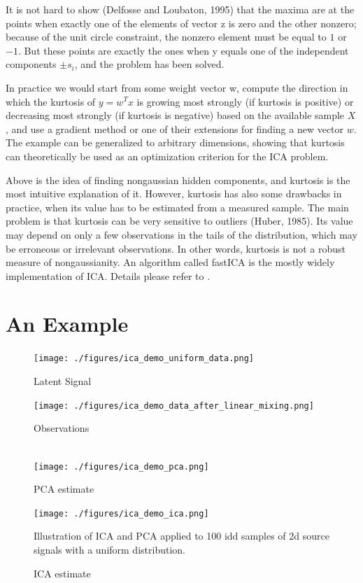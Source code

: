 \documentclass[a4paper]{book}
\begin{document}
    It is not hard to show (Delfosse and Loubaton, 1995) that the maxima are
    at the points when exactly one of the elements of vector z is zero and
    the other nonzero; because of the unit circle constraint, the nonzero
    element must be equal to $1$ or $-1$. But these points are exactly the ones
    when y equals one of the independent components $±s_{i}$, and the problem has
    been solved.

    In practice we would start from some weight vector w, compute the
    direction in which the kurtosis of $y = w^{T}x$ is growing most strongly
    (if kurtosis is positive) or decreasing most strongly (if kurtosis
    is negative) based on the available sample $X$, and use a gradient
    method or one of their extensions for finding a new vector $w$. The
    example can be generalized to arbitrary dimensions, showing that
    kurtosis can theoretically be used as an optimization criterion for
    the ICA problem.

    Above is the idea of finding nongaussian hidden components, and
    kurtosis is the most intuitive explanation of it. However, kurtosis
    has also some drawbacks in practice, when its value has to be
    estimated from a measured sample. The main problem is that kurtosis
    can be very sensitive to outliers (Huber, 1985).  Its value may
    depend on only a few observations in the tails of the distribution,
    which may be erroneous or irrelevant observations. In other words,
    kurtosis is not a robust measure of nongaussianity. An algorithm
    called fastICA is the mostly widely implementation of ICA. Details
    please refer to \cite{Hyvarinen:2000:ICA:351654.351659}.

  \section{An Example}

  \begin{figure}
    \texttt{[image: ./figures/ica\_demo\_uniform\_data.png]}
    \caption{Latent Signal\label{fig:ica_demo_uniform_data.png}}

    \endminipage
    \texttt{[image: ./figures/ica\_demo\_data\_after\_linear\_mixing.png]}
    \caption{Observations\label{fig:ica_demo_data_after_linear_mixing.png}}

    \endminipage\hfill
    \\
    \texttt{[image: ./figures/ica\_demo\_pca.png]}
    \caption{PCA estimate\label{fig:ica_demo_pca.png}}

    \endminipage
    \texttt{[image: ./figures/ica\_demo\_ica.png]}
    \caption{ICA estimate\label{fig:ica_demo_ica.png}}

    \endminipage

    \begin{center}
      Illustration of ICA and PCA applied to 100 idd samples of 2d
      source signals with a uniform distribution.
    \end{center}
  \end{figure}
\end{document}
